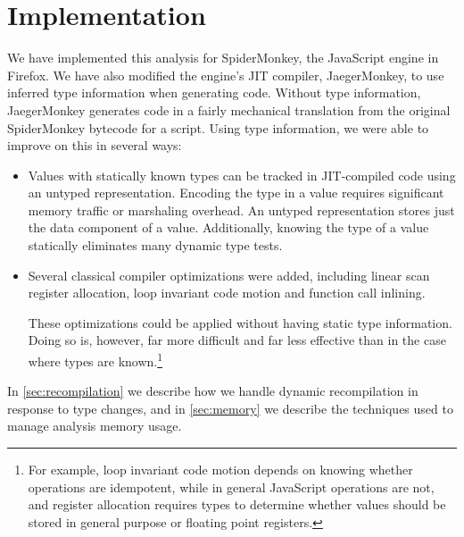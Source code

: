 
\section{Implementation}
\label{sec:implementation}

We have implemented this analysis for SpiderMonkey, the JavaScript engine
in Firefox.
We have also modified the engine's JIT compiler, JaegerMonkey, to use
inferred type information when generating code.
Without type information, JaegerMonkey generates code in a fairly mechanical
translation from the original SpiderMonkey bytecode for a script.
Using type information, we were able to improve on this in several ways:

\begin{itemize}

\item Values with statically known types can be tracked in JIT-compiled code
using an untyped representation.
Encoding the type in a value requires significant memory traffic or
marshaling overhead.
An untyped representation stores just the data component of a value.
Additionally, knowing the type of a value statically eliminates many
dynamic type tests.

\item Several classical compiler optimizations were added,
including linear scan register allocation, loop invariant code motion
and function call inlining.

These optimizations could be applied without
having static type information.
Doing so is, however, far more difficult and far less effective than in
the case where types are known.\footnote{For example, loop invariant code motion depends
on knowing whether operations
are idempotent, while in general JavaScript operations are not,
and register allocation requires types to determine whether values should
be stored in general purpose or floating point registers.}

\end{itemize}

In \Section\ref{sec:recompilation} we describe how we handle dynamic recompilation in
response to type changes, and in \Section\ref{sec:memory} we describe the techniques
used to manage analysis memory usage.

